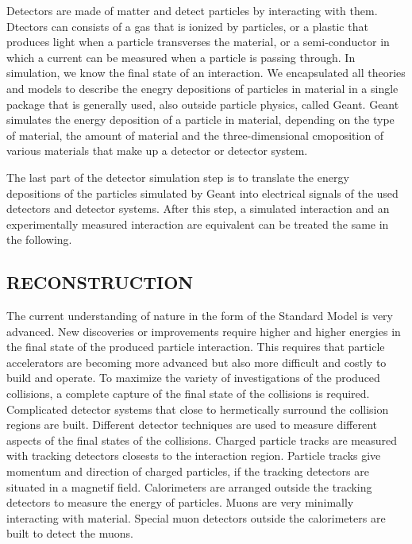 \documentclass{wscpaperproc}
\theoremstyle{wsc}
\begin{document}
Detectors are made of matter and detect particles by interacting with them. Dtectors can consists of a gas that is ionized by particles, or a plastic that produces light when a particle transverses the material, or a semi-conductor in which a current can be measured when a particle is passing through. In simulation, we know the final state of an interaction. We encapsulated all theories and models to describe the enegry depositions of particles in material in a single package that is generally used, also outside particle physics, called Geant. Geant simulates the energy deposition of a particle in material, depending on the type of material, the amount of material and the three-dimensional cmoposition of various materials that make up a detector or detector system. 

The last part of the detector simulation step is to translate the energy depositions of the particles simulated by Geant into electrical signals of the used detectors and detector systems. After this step, a simulated interaction and an experimentally measured interaction are equivalent can be treated the same in the following.

\subsection{RECONSTRUCTION}
\label{subsec:reconstruction}

The current understanding of nature in the form of the Standard Model is very advanced. New discoveries or improvements require higher and higher energies in the final state of the produced particle interaction. This requires that particle accelerators are becoming more advanced but also more difficult and costly to build and operate. To maximize the variety of investigations of the produced collisions, a complete capture of the final state of the collisions is required. Complicated detector systems that close to hermetically surround the collision regions are built. Different detector techniques are used to measure different aspects of the final states of the collisions. Charged particle tracks are measured with tracking detectors closests to the interaction region. Particle tracks give momentum and direction of charged particles, if the tracking detectors are situated in a magnetif field. Calorimeters are arranged outside the tracking detectors to measure the energy of particles. Muons are very minimally interacting with material. Special muon detectors outside the calorimeters are built to detect the muons.
\end{document}
